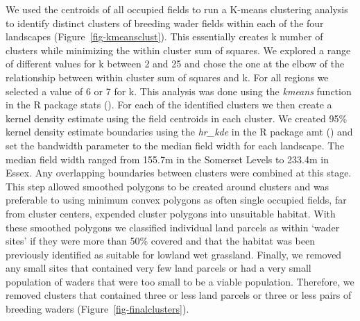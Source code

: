 \documentclass[
  12pt,
  letterpaper,
  DIV=11,
  numbers=noendperiod]{scrartcl}
\begin{document}
We used the centroids of all occupied fields to run a K-means clustering
analysis to identify distinct clusters of breeding wader fields within
each of the four landscapes (Figure~\ref{fig-kmeansclust}). This
essentially creates k number of clusters while minimizing the within
cluster sum of squares. We explored a range of different values for k
between 2 and 25 and chose the one at the elbow of the relationship
between within cluster sum of squares and k. For all regions we selected
a value of 6 or 7 for k. This analysis was done using the \emph{kmeans}
function in the R package stats (). For each of the identified clusters we then create a kernel
density estimate using the field centroids in each cluster. We created
95\% kernel density estimate boundaries using the \emph{hr\_kde} in the
R package amt () and set the bandwidth parameter to the median field width for
each landscape. The median field width ranged from 155.7m in the
Somerset Levels to 233.4m in Essex. Any overlapping boundaries between
clusters were combined at this stage. This step allowed smoothed
polygons to be created around clusters and was preferable to using
minimum convex polygons as often single occupied fields, far from
cluster centers, expended cluster polygons into unsuitable habitat. With
these smoothed polygons we classified individual land parcels as within
`wader sites' if they were more than 50\% covered and that the habitat
was been previously identified as suitable for lowland wet grassland.
Finally, we removed any small sites that contained very few land parcels
or had a very small population of waders that were too small to be a
viable population. Therefore, we removed clusters that contained three
or less land parcels or three or less pairs of breeding waders
(Figure~\ref{fig-finalclusters}).
\end{document}
